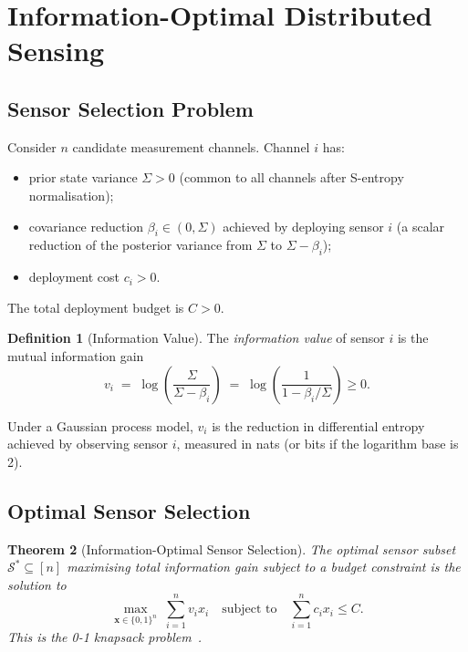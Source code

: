 \documentclass[10pt,twocolumn]{article}
\theoremstyle{plain}
\newtheorem{theorem}{Theorem}[section]
\theoremstyle{definition}
\newtheorem{definition}[theorem]{Definition}
\theoremstyle{remark}
\newcommand{\Scal}{\mathcal{S}}
\begin{document}
\section{Information-Optimal Distributed Sensing}
\label{sec:sensing}

\subsection{Sensor Selection Problem}
\label{ssec:sensorsel}

Consider $n$ candidate measurement channels.  Channel $i$ has:
\begin{itemize}
  \item prior state variance $\Sigma > 0$ (common to all channels
        after S-entropy normalisation);
  \item covariance reduction $\beta_i \in (0,\Sigma)$ achieved by
        deploying sensor $i$ (a scalar reduction of the posterior
        variance from $\Sigma$ to $\Sigma - \beta_i$);
  \item deployment cost $c_i > 0$.
\end{itemize}
The total deployment budget is $C > 0$.

\begin{definition}[Information Value]
\label{def:infoval}
The \emph{information value} of sensor $i$ is the mutual information
gain~\cite{Cover2006}
\begin{equation}
  v_i \;=\; \log\!\left(\frac{\Sigma}{\Sigma - \beta_i}\right)
       \;=\; \log\!\left(\frac{1}{1 - \beta_i/\Sigma}\right) \geq 0.
  \label{eq:infoval}
\end{equation}
\end{definition}

Under a Gaussian process model, $v_i$ is the reduction in differential
entropy achieved by observing sensor $i$, measured in nats (or bits if
the logarithm base is 2).

\subsection{Optimal Sensor Selection}
\label{ssec:optsel}

\begin{theorem}[Information-Optimal Sensor Selection]
\label{thm:sensor}
The optimal sensor subset $\Scal^* \subseteq [n]$ maximising total
information gain subject to a budget constraint is the solution to
\begin{equation}
  \max_{\mathbf{x}\in\{0,1\}^n}\;\sum_{i=1}^n v_i x_i
  \quad\text{subject to}\quad
  \sum_{i=1}^n c_i x_i \leq C.
  \label{eq:knapsack}
\end{equation}
This is the \emph{0-1 knapsack problem}~\cite{Cover2006}.
\end{theorem}
\end{document}
